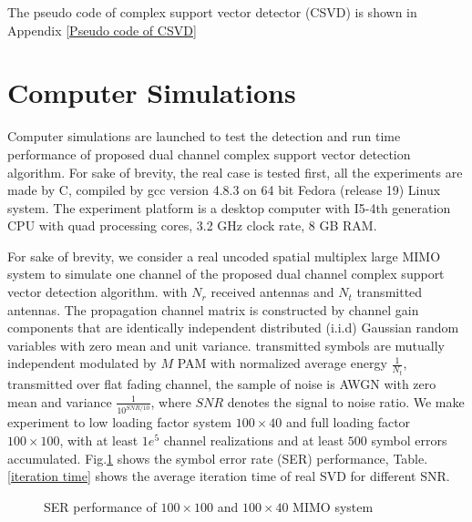 \documentclass[12pt, draftclsnofoot, onecolumn]{IEEEtran}
\begin{document}
\begin{spacing}{2}
\begin{algorithm}[htb]
\begin{algorithmic}
\EndProcedure
\end{algorithmic}
\label{1D2D damping}
\end{algorithm} 
\newpage
The pseudo code of complex support vector detector (CSVD) is shown in Appendix \ref{Pseudo code of CSVD}


 
\section{Computer Simulations}
Computer simulations are launched to test the detection and run time performance of proposed dual channel complex support vector detection algorithm. For sake of brevity, the real case is tested first, all the experiments are made by C, compiled by gcc version 4.8.3 on 64 bit Fedora (release 19) Linux system. The experiment platform is a desktop computer with I5-4th generation CPU with quad processing cores, 3.2 GHz clock rate, 8 GB RAM. 

For sake of brevity, we consider a real uncoded spatial multiplex large MIMO system to simulate one channel of the proposed dual channel complex support vector detection algorithm.  with $N_{r}$ received antennas and $N_{t}$ transmitted antennas. The propagation channel matrix is constructed by channel gain components that are identically independent distributed (i.i.d) Gaussian random variables with zero mean and unit variance. transmitted symbols are mutually independent modulated by $M$ PAM with normalized average energy $\frac{1}{N_{t}}$, transmitted over flat fading channel, the sample of noise is AWGN with zero mean and variance $\frac{1}{10^{SNR/10}}$, where $SNR$ denotes the signal to noise ratio. 
We make experiment to low loading factor system $100\times 40$ and full loading factor $100\times 100$, with at least $1e^{5}$ channel realizations and at least $500$ symbol errors accumulated. Fig.\ref{SER performance} shows the symbol error rate (SER) performance, Table.\ref{iteration time} shows the average iteration time of real SVD for different SNR. 
\begin{figure}[htb]
\centering
\def\svgwidth{\columnwidth}

\caption{SER performance of $100\times 100 $ and $100\times 40$ MIMO system}
\label{SER performance}
\end{figure}


\end{spacing}
\end{document}
